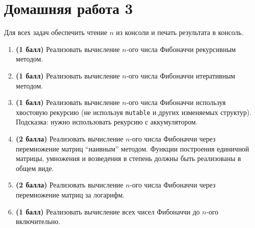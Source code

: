 \section{Домашняя работа 3}

Для всех задач обеспечить чтение $n$ из консоли и печать результата в консоль.

\begin{enumerate}
    \item \textbf{(1 балл)} Реализовать вычисление $n$-ого числа Фибоначчи рекурсивным методом. 
    \item \textbf{(1 балл)} Реализовать вычисление $n$-ого числа Фибоначчи итеративным методом. 
    \item \textbf{(1 балл)} Реализовать вычисление $n$-ого числа Фибоначчи используя хвостовую рекурсию (не используя \texttt{mutable} и других изменяемых структур). Подсказка: нужно использовать рекурсию с аккумулятором.
    \item \textbf{(2 балла)} Реализовать вычисление $n$-ого числа Фибоначчи через перемножение матриц ``наивным'' методом. Функции построения единичной матрицы, умножения и возведения в степень должны быть реализованы в общем виде.
    \item \textbf{(2 балла)} Реализовать вычисление $n$-ого числа Фибоначчи через перемножение матриц за логарифм.
    \item \textbf{(1 балл)} Реализовать вычисление всех чисел Фибоначчи до $n$-ого включительно.
\end{enumerate}